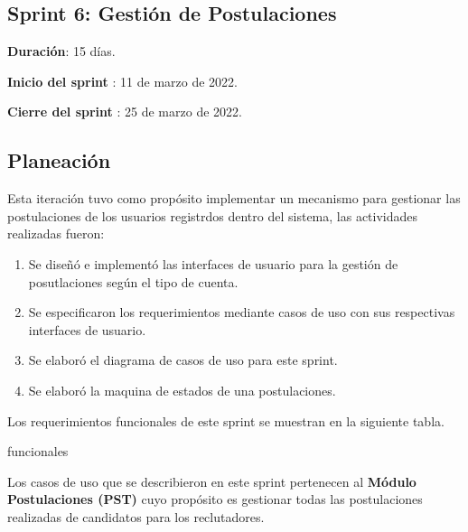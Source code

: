 \subsection{Sprint 6: Gestión de Postulaciones}
    \begin{description}
        \item \textbf{Duración}: 15 días.
        \item \textbf{Inicio del sprint }: 11 de marzo de 2022.
        \item \textbf{Cierre del sprint }: 25 de marzo de 2022.
    \end{description}

    \subsection{Planeación}

Esta iteración tuvo como propósito implementar un mecanismo para gestionar las postulaciones de los usuarios registrdos dentro del 
sistema, las actividades realizadas fueron:
\begin{enumerate}
    \item Se diseñó e implementó las interfaces de usuario para la gestión de posutlaciones según el tipo de cuenta.
    \item Se especificaron los requerimientos mediante casos de uso con sus respectivas interfaces de usuario.
    \item Se elaboró el diagrama de casos de uso para este sprint.
    \item Se elaboró la maquina de estados de una postulaciones.
\end{enumerate} 

Los requerimientos funcionales de este sprint se muestran en la siguiente tabla.
\begin{requerimientos}{funcionales}
        
\end{requerimientos}
Los casos de uso que se describieron en este sprint pertenecen al \textbf{Módulo Postulaciones (PST)} cuyo propósito es gestionar
todas las postulaciones realizadas de candidatos para los reclutadores.

